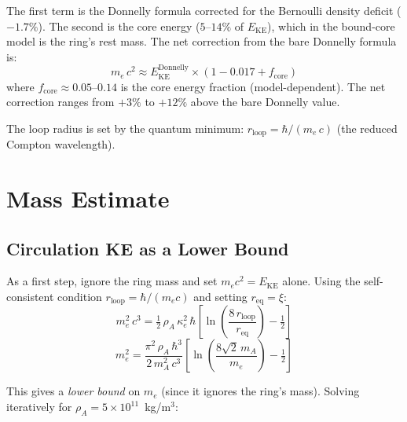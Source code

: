 \documentclass[12pt,letterpaper]{article}
\newcommand{\rhoa}{\rho_{\!A}}
\newcommand{\rloop}{r_{\mathrm{loop}}}
\begin{document}
The first term is the Donnelly formula corrected for the Bernoulli density
deficit ($-1.7\%$).  The second is the core energy ($5$--$14\%$ of
$E_{\mathrm{KE}}$), which in the bound-core model is the ring's rest mass.
The net correction from the bare Donnelly formula is:
%
\begin{equation}
  m_e\,c^2 \approx E_{\mathrm{KE}}^{\mathrm{Donnelly}} \times
  (1 - 0.017 + f_{\mathrm{core}})
\end{equation}
%
where $f_{\mathrm{core}} \approx 0.05$--$0.14$ is the core energy fraction
(model-dependent).  The net correction ranges from $+3\%$ to $+12\%$
above the bare Donnelly value.

The loop radius is set by the quantum minimum:
$\rloop = \hbar/(m_e\,c)$ (the reduced Compton wavelength).


\section{Mass Estimate}
\label{sec:estimate}

\subsection{Circulation KE as a Lower Bound}

As a first step, ignore the ring mass and set $m_e c^2 = E_{\mathrm{KE}}$
alone.  Using the self-consistent condition $\rloop = \hbar/(m_e c)$ and
setting $r_{\mathrm{eq}} = \xi$:
%
\begin{equation}
  m_e^2\,c^3 = \tfrac{1}{2}\,\rhoa\,\kappa_e^2\,\hbar
  \left[\ln\!\left(\frac{8\,\rloop}{r_{\mathrm{eq}}}\right) - \tfrac{1}{2}\right]
  \label{eq:self-consistent}
\end{equation}
%
\begin{equation}
  m_e^2 = \frac{\pi^2\,\rhoa\,\hbar^3}{2\,m_A^2\,c^3}
  \left[\ln\!\left(\frac{8\sqrt{2}\,m_A}{m_e}\right) - \tfrac{1}{2}\right]
  \label{eq:self-consistent-explicit}
\end{equation}

This gives a \emph{lower bound} on $m_e$ (since it ignores the ring's mass).
Solving iteratively for $\rhoa = 5 \times 10^{11}$~kg/m$^3$:
\end{document}
